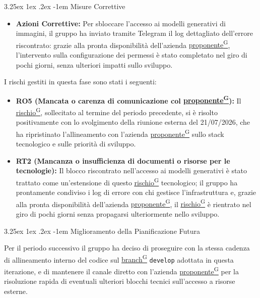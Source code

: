 \documentclass[a4paper,12pt]{article}
\makeatletter
\renewcommand\paragraph{\@startsection{paragraph}{5}{\z@}%
  {3.25ex \@plus1ex \@minus.2ex}%
  {-1em}%
  {\normalfont\normalsize\bfseries}}
\providecommand{\glslink}[2]{\href{https://alittlebyte-19.github.io/Documentazione/glossario.html\#gls-#1}{\underline{#2}\textsuperscript{\scriptsize G}}}
\makeatother
\begin{document}
\paragraph{Misure Correttive}

\begin{itemize}
    \item \textbf{Azioni Correttive:} Per sbloccare l'accesso ai modelli generativi di immagini, il gruppo ha inviato tramite Telegram il log dettagliato dell'errore riscontrato: grazie alla pronta disponibilità dell'azienda \glslink{committente-proponente}{proponente}, l'intervento sulla configurazione dei permessi è stato completato nel giro di pochi giorni, senza ulteriori impatti sullo sviluppo.
\end{itemize}
I rischi gestiti in questa fase sono stati i seguenti:
\begin{itemize}
    \item \textbf{RO5 (Mancata o carenza di comunicazione col \glslink{committente-proponente}{proponente}):} Il \glslink{rischio}{rischio}, sollecitato al termine del periodo precedente, si è risolto positivamente con lo svolgimento della riunione esterna del 21/07/2026, che ha ripristinato l'allineamento con l'azienda \glslink{committente-proponente}{proponente} sullo stack tecnologico e sulle priorità di sviluppo.
    \item \textbf{RT2 (Mancanza o insufficienza di documenti o risorse per le tecnologie):} Il blocco riscontrato nell'accesso ai modelli generativi è stato trattato come un'estensione di questo \glslink{rischio}{rischio} tecnologico; il gruppo ha prontamente condiviso i log di errore con chi gestisce l'infrastruttura e, grazie alla pronta disponibilità dell'azienda \glslink{committente-proponente}{proponente}, il \glslink{rischio}{rischio} è rientrato nel giro di pochi giorni senza propagarsi ulteriormente nello sviluppo.
\end{itemize}


\paragraph{Miglioramento della Pianificazione Futura}

Per il periodo successivo il gruppo ha deciso di proseguire con la stessa cadenza di allineamento interno del codice sul \glslink{branch}{branch} \texttt{develop} adottata in questa iterazione, e di mantenere il canale diretto con l'azienda \glslink{committente-proponente}{proponente} per la risoluzione rapida di eventuali ulteriori blocchi tecnici sull'accesso a risorse esterne.
\end{document}
